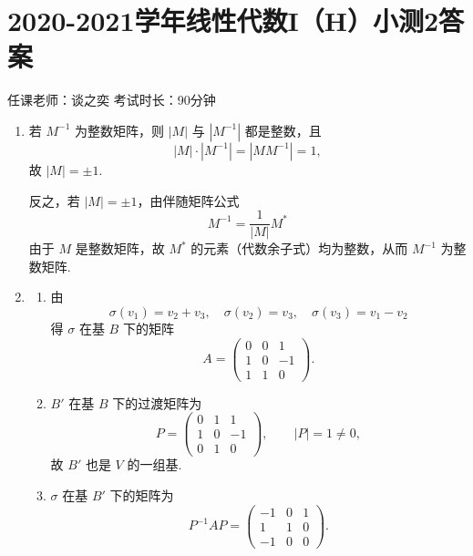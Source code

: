 \section{2020-2021学年线性代数I（H）小测2答案}

\begin{center}
    任课老师：谈之奕\hspace{4em} 考试时长：90分钟
\end{center}
\begin{enumerate}
    \item 若 $M^{-1}$ 为整数矩阵，则 $|M|$ 与 $|M^{-1}|$ 都是整数，且
    \[
        |M|\cdot|M^{-1}|=|MM^{-1}|=1,
    \]
    故 $|M|=\pm 1$.

    反之，若 $|M|=\pm 1$，由伴随矩阵公式
    \[
        M^{-1}=\frac{1}{|M|}M^*
    \]
    由于 $M$ 是整数矩阵，故 $M^*$ 的元素（代数余子式）均为整数，从而 $M^{-1}$ 为整数矩阵.

    \item
    \begin{enumerate}
        \item 由
        \[
            \sigma(v_1)=v_2+v_3,\quad
            \sigma(v_2)=v_3,\quad
            \sigma(v_3)=v_1-v_2
        \]
        得 $\sigma$ 在基 $B$ 下的矩阵
        \[
            A=\begin{pmatrix}
                0&0&1\\
                1&0&-1\\
                1&1&0
            \end{pmatrix}.
        \]

        \item $B'$ 在基 $B$ 下的过渡矩阵为
        \[
            P=\begin{pmatrix}
                0&1&1\\
                1&0&-1\\
                0&1&0
            \end{pmatrix},\qquad |P|=1\neq 0,
        \]
        故 $B'$ 也是 $V$ 的一组基.

        \item $\sigma$ 在基 $B'$ 下的矩阵为
        \[
            P^{-1}AP=
            \begin{pmatrix}
                -1&0&1\\
                1&1&0\\
                -1&0&0
            \end{pmatrix}.
        \]
    \end{enumerate}


\end{enumerate}
